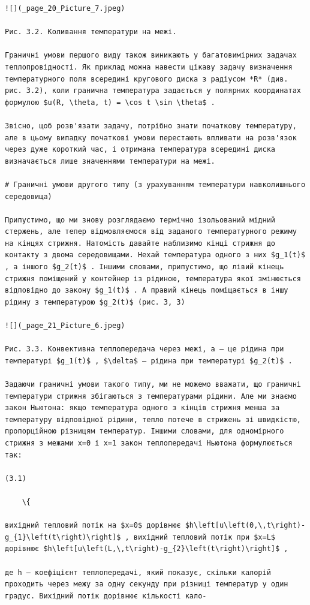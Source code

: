 \documentclass[
]{article}
\begin{document}
\begin{verbatim}
![](_page_20_Picture_7.jpeg)

Рис. 3.2. Коливання температури на межі.

Граничні умови першого виду також виникають у багатовимірних задачах теплопровідності. Як приклад можна навести цікаву задачу визначення температурного поля всередині кругового диска з радіусом *R* (див. рис. 3.2), коли гранична температура задається у полярних координатах формулою $u(R, \theta, t) = \cos t \sin \theta$ .

Звісно, щоб розв'язати задачу, потрібно знати початкову температуру, але в цьому випадку початкові умови перестають впливати на розв'язок через дуже короткий час, і отримана температура всередині диска визначається лише значеннями температури на межі.

# Граничні умови другого типу (з урахуванням температури навколишнього середовища)

Припустимо, що ми знову розглядаємо термічно ізольований мідний стержень, але тепер відмовляємося від заданого температурного режиму на кінцях стрижня. Натомість давайте наблизимо кінці стрижня до контакту з двома середовищами. Нехай температура одного з них $g_1(t)$ , а іншого $g_2(t)$ . Іншими словами, припустимо, що лівий кінець стрижня поміщений у контейнер із рідиною, температура якої змінюється відповідно до закону $g_1(t)$ . А правий кінець поміщається в іншу рідину з температурою $g_2(t)$ (рис. 3, 3)

![](_page_21_Picture_6.jpeg)

Рис. 3.3. Конвективна теплопередача через межі, a — це рідина при температурі $g_1(t)$ , $\delta$ — рідина при температурі $g_2(t)$ .

Задаючи граничні умови такого типу, ми не можемо вважати, що граничні температури стрижня збігаються з температурами рідини. Але ми знаємо закон Ньютона: якщо температура одного з кінців стрижня менша за температуру відповідної рідини, тепло потече в стрижень зі швидкістю, пропорційною різницям температур. Іншими словами, для одномірного стрижня з межами x=0 і x=1 закон теплопередачі Ньютона формулюється так:

(3.1)

    \{

вихідний тепловий потік на $x=0$ дорівнює $h\left[u\left(0,\,t\right)-g_{1}\left(t\right)\right]$ , вихідний тепловий потік при $x=L$ дорівнює $h\left[u\left(L,\,t\right)-g_{2}\left(t\right)\right]$ ,

де h — коефіцієнт теплопередачі, який показує, скільки калорій проходить через межу за одну секунду при різниці температур у один градус. Вихідний потік дорівнює кількості кало-


\end{verbatim}
\end{document}
